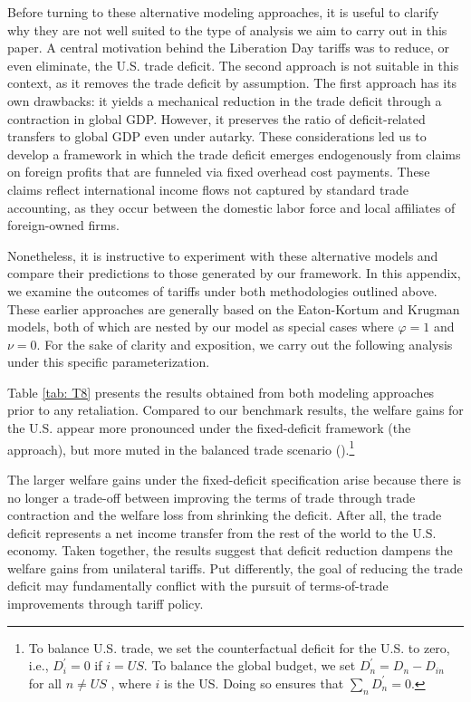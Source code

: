 \documentclass[12pt]{article}
\begin{document}
Before turning to these alternative modeling approaches, it is useful to clarify why they are not well suited to the type of analysis we aim to carry out in this paper. A central motivation behind the Liberation Day tariffs was to reduce, or even eliminate, the U.S. trade deficit. The second approach is not suitable in this context, as it removes the trade deficit by assumption. The first approach has its own drawbacks: it yields a mechanical reduction in the trade deficit through a contraction in global GDP. However, it preserves the ratio of deficit-related transfers to global GDP even under autarky. These considerations led us to develop a framework in which the trade deficit emerges endogenously from claims on foreign profits that are funneled via fixed overhead cost payments. These claims reflect international income flows not captured by standard trade accounting, as they occur between the domestic labor force and local affiliates of foreign-owned firms.

Nonetheless, it is instructive to experiment with these alternative models and compare their predictions to those generated by our framework. In this appendix, we examine the outcomes of tariffs under both methodologies outlined above. These earlier approaches are generally based on the Eaton-Kortum and Krugman models, both of which are nested by our model as special cases where $\varphi = 1$ and $\nu = 0$. For the sake of clarity and exposition, we carry out the following analysis under this specific parameterization.

Table \ref{tab: T8} presents the results obtained from both modeling approaches prior to any retaliation. Compared to our benchmark results, the welfare gains for the U.S. appear more pronounced under the fixed-deficit framework (the \cite{DEK} approach), but more muted in the balanced trade scenario (\cite{Ossa}).\footnote{To balance U.S. trade, we set the counterfactual deficit for the U.S. to zero, i.e., $D_i^{'}=0$  if $i=US$. To balance the global budget, we set $D_n^{'}=D_n-D_{in}$  for all $n\neq US$ , where $i$  is the US. Doing so ensures that $\sum_n D_n^{'} = 0$.} 

The larger welfare gains under the fixed-deficit specification arise because there is no longer a trade-off between improving the terms of trade through trade contraction and the welfare loss from shrinking the deficit. After all, the trade deficit represents a net income transfer from the rest of the world to the U.S. economy. Taken together, the results suggest that deficit reduction dampens the welfare gains from unilateral tariffs. Put differently, the goal of reducing the trade deficit may fundamentally conflict with the pursuit of terms-of-trade improvements through tariff policy.
\end{document}

